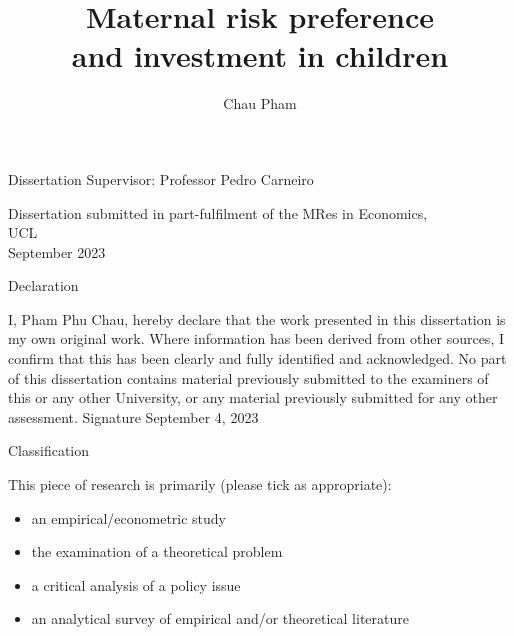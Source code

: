 \documentclass[emulatestandardclasses, 10pt, abstract = true]{scrartcl}
\title{Maternal risk preference \\and investment in children}
\author{Chau Pham}
\date{}
\newcommand\itembox{\item[$\square$]}
\newcommand{\cmark}{\ding{51}}
\newcommand{\done}{\rlap{$\square$}{\raisebox{2pt}{\large\hspace{1pt}\cmark}}%
	\hspace{-2.5pt}}
\begin{document}
\onehalfspacing
\begin{titlingpage}
\maketitle
\begin{center}
	\Large Dissertation Supervisor: Professor Pedro Carneiro
\end{center}
\vspace{4cm}
\begin{center}
	\large
	Dissertation submitted in part-fulfilment of the MRes in Economics,\\ \vspace{0.5cm}
	UCL\\ \vspace{0.5cm}
	September 2023
	
\end{center}
\end{titlingpage}


\begin{titlingpage}
	\begin{center}
		{\Large Declaration}
		\vskip 1cm
		\begin{minipage}[!h]{.89\linewidth}\large 
			I, Pham Phu Chau, hereby declare that the work presented in this dissertation is my own original work. Where information has been derived from other sources, I confirm that this has been clearly and fully identified and acknowledged. No part of this dissertation contains material previously submitted to the examiners of this or any other University, or any material previously submitted for any other assessment.
			\vskip 2cm
			Signature
			\vskip 2cm
			September 4, 2023
		\end{minipage}
		\vskip 4cm
		\begin{minipage}[!h]{.89\linewidth}
			\begin{center}
				\Large Classification \vskip 0.5cm
			\end{center}
			\large
			This piece of research is primarily (please tick as appropriate):
			\begin{itemize}
				\item[\done] an empirical/econometric study
				\itembox the examination of a theoretical problem
				\itembox a critical analysis of a policy issue
				\itembox an analytical survey of empirical and/or theoretical literature
			\end{itemize}
		\end{minipage}
	\end{center}
\end{titlingpage}
\end{document}
